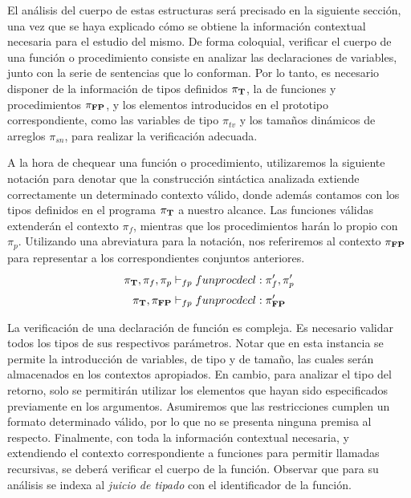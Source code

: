 El análisis del cuerpo de estas estructuras será precisado en la siguiente sección, una vez que se haya explicado cómo se obtiene la información contextual necesaria para el estudio del mismo.
De forma coloquial, verificar el cuerpo de una función o procedimiento consiste en analizar las declaraciones de variables, junto con la serie de sentencias que lo conforman.
Por lo tanto, es necesario disponer de la información de tipos definidos $\pi_{\mathbf{T}}$, la de funciones y procedimientos $\pi_{\mathbf{FP}}$, y los elementos introducidos en el prototipo correspondiente, como las variables de tipo $\pi_{tv}$ y los tamaños dinámicos de arreglos $\pi_{sn}$, para realizar la verificación adecuada.

A la hora de chequear una función o procedimiento, utilizaremos la siguiente notación para denotar que la construcción sintáctica analizada extiende correctamente un determinado contexto válido, donde además contamos con los tipos definidos en el programa $\pi_{\mathbf{T}}$ a nuestro alcance.
Las funciones válidas extenderán el contexto $\pi_{f}$, mientras que los procedimientos harán lo propio con $\pi_{p}$.
Utilizando una abreviatura para la notación, nos referiremos al contexto $\pi_{\mathbf{FP}}$ para representar a los correspondientes conjuntos anteriores.
\begin{gather*}
\PI{T}, \pi_{f}, \pi_{p} \DASH{fp} funprocdecl : \pi'_{f}, \pi'_{p}
\\
\PI{T}, \PI{FP} \DASH{fp} funprocdecl : \PI{FP}'
\end{gather*}

La verificación de una declaración de función es compleja.
Es necesario validar todos los tipos de sus respectivos parámetros.
Notar que en esta instancia se permite la introducción de variables, de tipo y de tamaño, las cuales serán almacenados en los contextos apropiados.
En cambio, para analizar el tipo del retorno, solo se permitirán utilizar los elementos que hayan sido especificados previamente en los argumentos.
Asumiremos que las restricciones cumplen un formato determinado válido, por lo que no se presenta ninguna premisa al respecto.
Finalmente, con toda la información contextual necesaria, y extendiendo el contexto correspondiente a funciones para permitir llamadas recursivas, se deberá verificar el cuerpo de la función.
Observar que para su análisis se indexa al \textit{juicio de tipado} con el identificador de la función.

